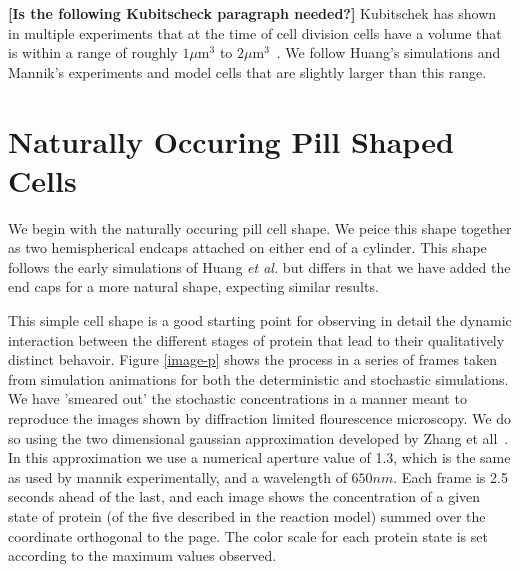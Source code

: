 \documentclass[letterpaper,twocolumn,amsmath,amssymb,pre]{revtex4-1}
\newcommand{\red}[1]{{\bf \color{red} #1}}
\newcommand{\fixme}[1]{\red{[#1]}}
\newcommand\micron{\ensuremath{\mu\text{m}}}
\begin{document}

\fixme{Is the following Kubitscheck paragraph needed?}
Kubitschek has shown in multiple experiments that at the time of cell
division cells have a volume that is within a range of roughly
$1\micron^3$ to $2\micron^3$~\cite{kubitschek1990cell,
  kubitschek1968linear}.  We follow Huang's
simulations\cite{huang2003dynamic} and Mannik's experiments and model
cells that are slightly larger than this range.

\section{Naturally Occuring Pill Shaped Cells}

We begin with the naturally occuring pill cell shape.  We peice this
shape together as two hemispherical endcaps attached on either end of
a cylinder.  This shape follows the early simulations of Huang
\emph{et al.} but differs in that we have added the end caps for a
more natural shape, expecting similar results.

This simple cell shape is a good starting point for observing in
detail the dynamic interaction between the different stages of protein
that lead to their qualitatively distinct behavoir. Figure
\ref{image-p} shows the process in a series of frames taken from
simulation animations for both the deterministic and stochastic
simulations.  We have 'smeared out' the stochastic concentrations in a
manner meant to reproduce the images shown by diffraction limited
flourescence microscopy.  We do so using the two dimensional gaussian
approximation developed by Zhang et all~\cite{zhang2007gaussian}.  In
this approximation we use a numerical aperture value of 1.3, which is
the same as used by mannik experimentally, and a wavelength of
$650nm$.  Each frame is 2.5 seconds ahead of the last, and each image
shows the concentration of a given state of protein (of the five
described in the reaction model) summed over the coordinate orthogonal
to the page.  The color scale for each protein state is set according
to the maximum values observed.
\end{document}
